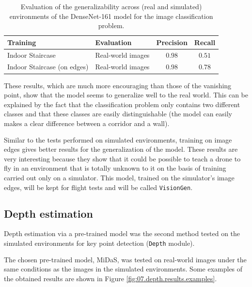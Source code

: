 \begin{table}[H]
    \centering
    \begin{tabular}{|l|l|c|c|}
        \hline
        \textbf{Training} & \textbf{Evaluation} & \textbf{Precision} & \textbf{Recall} \\ \hline
        Indoor Staircase & Real-world images & $\num{0.98}$ & $\num{0.51}$ \\ \hline
        Indoor Staircase (on edges) & Real-world images & $\num{0.98}$ & $\num{0.78}$ \\ \hline
    \end{tabular}
    \caption{Evaluation of the generalizability across (real and simulated) environments of the DenseNet-161 model for the image classification problem.}
    \label{tab:07.classification.generalization.evaluation}
\end{table}

These results, which are much more encouraging than those of the vanishing point, show that the model seems to generalize well to the real world. This can be explained by the fact that the classification problem only contains two different classes and that these classes are easily distinguishable (the model can easily makes a clear difference between a corridor and a wall).

Similar to the tests performed on simulated environments, training on image edges gives better results for the generalization of the model. These results are very interesting because they show that it could be possible to teach a drone to fly in an environment that is totally unknown to it on the basis of training carried out only on a simulator. This model, trained on the simulator's image edges, will be kept for flight tests and will be called \texttt{VisionGen}.

\subsection{Depth estimation}

Depth estimation via a pre-trained model was the second method tested on the simulated environments for key point detection (\texttt{Depth} module).

The chosen pre-trained model, MiDaS, was tested on real-world images under the same conditions as the images in the simulated environments. Some examples of the obtained results are shown in Figure \ref{fig:07.depth.results.examples}.

